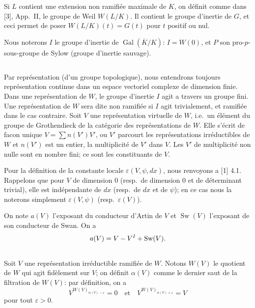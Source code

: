 \documentclass[12pt,a4paper]{article}
\theoremstyle{plain}
\theoremstyle{definition}
\theoremstyle{remark}
\DeclareMathOperator{\sw}{Sw}
\let\dim\relax\let\det\relax
\providecommand{\Gal}{\operatorname{Gal}}
\begin{document}
Si $L$ contient une extension non ramifi\'ee maximale de $K$, on d\'efinit comme dans [3], App.~II, le groupe de Weil $W(L/K)$. Il contient le groupe d'inertie de $G$, et ceci permet de poser $W(L/K)(t) = G(t)$ pour $t$ positif ou nul.

Nous noterons $I$ le groupe d'inertie de $\Gal(\overline{K}/K)$: $I = W(0)$, et $P$ son pro-$p$-sous-groupe de Sylow (groupe d'inertie sauvage).

\subsection{}
\label{sec:0.5}

Par repr\'esentation (d'un groupe topologique), nous entendrons toujours repr\'esentation continue dans un espace vectoriel complexe de dimension finie. Dans une repr\'esentation de $W$, le groupe d'inertie $I$ agit a travers un groupe fini. Une repr\'esentation de $W$ sera dite non ramifi\'ee si $I$ agit trivialement, et ramifi\'ee dans le cas contraire. Soit $V$ une repr\'esentation virtuelle de $W$, i.e.~un \'el\'ement du groupe de Grothendieck de la cat\'egorie des repr\'esentations de $W$. Elle s'\'ecrit de facon unique $V = \sum n(V') V'$, ou $V'$ parcourt les repr\'esentations irr\'eductibles de $W$ et $n(V')$ est un entier, la multiplicit\'e de $V'$ dans $V$. Les $V'$ de multiplicit\'e non nulle sont en nombre fini; ce sont les constituants de $V$.

Pour la d\'efinition de la constante locale $\varepsilon(V, \psi, dx)$, nous renvoyons a [1] 4.1. Rappelons que pour $V$ de dimension 0 (resp.~de dimension 0 et de d\'eterminant trivial), elle est ind\'ependante de $dx$ (resp.~de $dx$ et de $\psi$); en ce cas nous la noterons simplement $\varepsilon(V, \psi)$ (resp.~$\varepsilon(V)$).

On note $a(V)$ l'exposant du conducteur d'Artin de $V$ et $\sw(V)$ l'exposant de son conducteur de Swan. On a
\[
a(V) = \dim V - \dim V^I + \sw(V).
\]

\subsection{}
\label{sec:0.6}

Soit $V$ une repr\'esentation irr\'eductible ramifi\'ee de $W$. Notons $W(V)$ le quotient de $W$ qui agit fid\`element sur $V$; on d\'efinit $\alpha(V)$ comme le dernier saut de la filtration de $W(V)$: par d\'efinition, on a
\[
V^{W(V)_{\alpha(V)-\varepsilon}} = 0 \quad \text{et} \quad V^{W(V)_{\alpha(V)+\varepsilon}} = V
\]
pour tout $\varepsilon > 0$.
\end{document}
